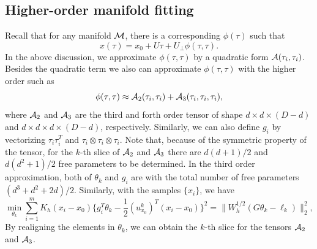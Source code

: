 \documentclass[aos,preprint]{imsart}
\theoremstyle{remark}
\begin{document}
\subsection{Higher-order manifold fitting}
Recall that for any manifold $\cal M$, there is a corresponding $\phi(\tau)$ such that
\[
x(\tau) = x_0+U \tau+U_\perp \phi(\tau,\tau).
\]
In the above discussion, we approximate $\phi(\tau,\tau)$ by a quadratic form ${\cal A}(\tau_i,\tau_i)$. Besides the quadratic term we also can approximate $\phi(\tau,\tau)$ with the higher order such as
\[
\phi(\tau,\tau) \approx {\cal A}_2 (\tau_i,\tau_i) + {\cal A}_3 (\tau_i,\tau_i,\tau_i),
\]
where ${\cal A}_2$ and ${\cal A}_3$ are the third and forth order tensor of shape $d\times d\times (D-d)$ and $d\times d\times d\times (D-d)$, respectively. Similarly, we can also define $g_i$ by vectorizing $\tau_i\tau_i^T$ and $\tau_i\otimes \tau_i\otimes \tau_i$. Note that, because of the symmetric property of the tensor, for the $k$-th slice of ${\cal A}_2$ and ${\cal A}_3$ there are $d(d+1)/2$ and $d(d^2+1)/2$ free parameters to be determined. In the third order approximation, both of $\theta_k$ and $g_i$ are with the total number of free parameters $(d^3+d^2+2d)/2$.
Similarly, with the samples $\{x_i\}$, we have
\begin{equation*}
  \min_{\theta_k} \sum_{i=1}^m K_h(x_i-x_0)\{ g_i^T \theta_k  - \frac{1}{2} {(u^k_{x_0})}^T (x_i -x_0)\}^2
= \|W_h^{1/2}(G \theta_k-\ell_k) \|_2^2,
\end{equation*}
By realigning the elements in $\theta_k$, we can obtain the $k$-th slice for the tensors ${\cal A}_2$ and ${\cal A}_3$.
\end{document}
